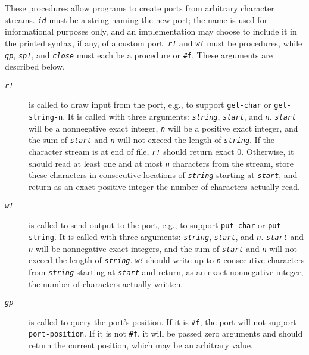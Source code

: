 These procedures allow programs to create ports from arbitrary character streams.
\texttt{\textit{id}} must be a string naming the new port; the name is used for informational
purposes only, and an implementation may choose to include it in the printed
syntax, if any, of a custom port.
\texttt{\textit{r!}} and \texttt{\textit{w!}} must be procedures, while \texttt{\textit{gp}}, \texttt{\textit{sp!}}, and
\texttt{\textit{close}} must each be a procedure or \texttt{\#{}f}.
These arguments are described below.

\begin{description}
\item[\texttt{\textit{r!}}]  is called to draw input from the port, e.g., to support
\texttt{get-char} or \texttt{get-string-n}.
It is called with three arguments: \texttt{\textit{string}}, \texttt{\textit{start}}, and \texttt{\textit{n}}.
\texttt{\textit{start}} will be a nonnegative exact integer, \texttt{\textit{n}} will be a
positive exact integer, and the sum of \texttt{\textit{start}} and \texttt{\textit{n}} will
not exceed the length of \texttt{\textit{string}}.
If the character stream is at end of file, \texttt{\textit{r!}} should return exact 0.
Otherwise, it should read at least one and at most \texttt{\textit{n}} characters from
the stream, store these characters in consecutive locations of \texttt{\textit{string}}
starting at \texttt{\textit{start}}, and return as an exact positive integer the
number of characters actually read.

\item[\texttt{\textit{w!}}]  is called to send output to the port, e.g., to support
\texttt{put-char} or \texttt{put-string}.
It is called with three arguments: \texttt{\textit{string}}, \texttt{\textit{start}}, and \texttt{\textit{n}}.
\texttt{\textit{start}} and \texttt{\textit{n}} will be nonnegative exact integers, and the
sum of \texttt{\textit{start}} and \texttt{\textit{n}} will not exceed the length of
\texttt{\textit{string}}.
\texttt{\textit{w!}} should write up to \texttt{\textit{n}} consecutive characters from
\texttt{\textit{string}} starting at \texttt{\textit{start}} and return, as an exact nonnegative
integer, the number of characters actually written.

\item[\texttt{\textit{gp}}]  is called to query the port's position.
If it is \texttt{\#{}f}, the port will not support \texttt{port-position}.
If it is not \texttt{\#{}f}, it will be passed zero arguments and should
return the current position, which may be an arbitrary value.


\end{description}
